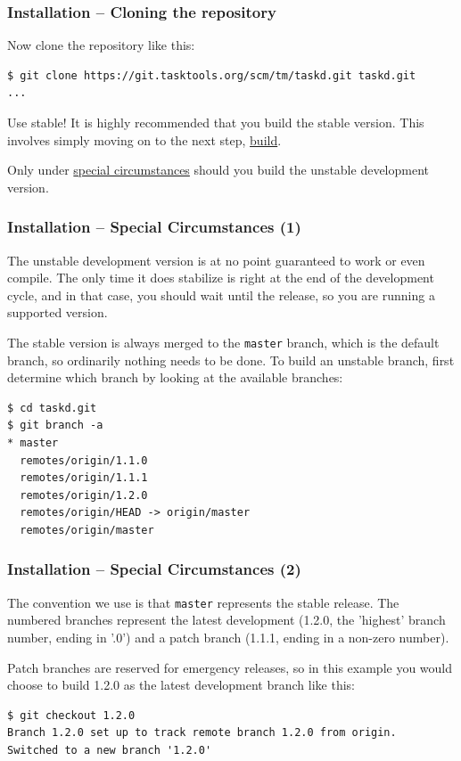 \documentclass[t,handout]{beamer}
\begin{document}
\begin{frame}[fragile]\frametitle{Installation -- Cloning the repository}\label{cloning}
    \vfill
    Now clone the repository like this:

    \begin{lstlisting}
$ git clone https://git.tasktools.org/scm/tm/taskd.git taskd.git
...\end{lstlisting}

    \vfill
    \begin{alertblock}{Use stable!}
        It is highly recommended that you build the stable version. This involves simply moving on to the next step, \hyperlink{buildgit}{build}.

        Only under \hyperlink{special}{special circumstances} should you build the unstable development version.
    \end{alertblock}
\end{frame}

\begin{frame}[fragile]\frametitle{Installation -- Special Circumstances (1)}\label{special}
    \vfill
    The unstable development version is at no point guaranteed to work or even compile. The only time it does stabilize is right at the end of the development cycle, and in that case, you should wait until the release, so you are running a supported version.

    The stable version is always merged to the \verb+master+ branch, which is the default branch, so ordinarily nothing needs to be done. To build an unstable branch, first determine which branch by looking at the available branches:

    \begin{lstlisting}
$ cd taskd.git
$ git branch -a
* master
  remotes/origin/1.1.0
  remotes/origin/1.1.1
  remotes/origin/1.2.0
  remotes/origin/HEAD -> origin/master
  remotes/origin/master\end{lstlisting}
\end{frame}

\begin{frame}[fragile]\frametitle{Installation -- Special Circumstances (2)}
    \vfill
    The convention we use is that \verb+master+ represents the stable release.  The numbered branches represent the latest development (1.2.0, the 'highest' branch number, ending in '.0') and a patch branch (1.1.1, ending in a non-zero number).

    Patch branches are reserved for emergency releases, so in this example you would choose to build 1.2.0 as the latest development branch like this:

    \begin{lstlisting}
$ git checkout 1.2.0
Branch 1.2.0 set up to track remote branch 1.2.0 from origin.
Switched to a new branch '1.2.0'\end{lstlisting}
\end{frame}
\end{document}

